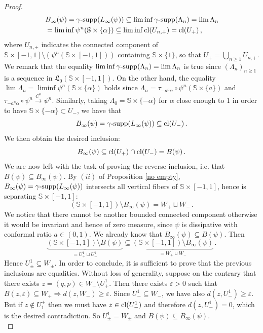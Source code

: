 \documentclass{article}
\newcommand{\1}{\mathbbm{1}}
\theoremstyle{remark}
\begin{document}
\begin{proof}
\begin{eqnarray*}
 & B_{\infty}(\psi) = \gamma\textnormal{-supp}(L_{\infty}(\psi)) \subseteq
 \liminf \gamma\textnormal{-supp}(\Lambda_n) = \lim \Lambda_n \\ & = \liminf \psi^n(\mathbb{S} \times \{\alpha\}) \subseteq \liminf \textnormal{cl}(U_{n,+}) = \textnormal{cl}(U_+)\, ,     
\end{eqnarray*}
where $U_{n,+}$ indicates the connected component of $\mathbb{S} \times [-1,1] \setminus (\psi^n(\mathbb{S} \times [-1,1]))$ containing $\mathbb{S} \times \{1\}$, so that $U_+ = \bigcup_{n \ge 1} U_{n,+}$. \\
We remark that the equality $ \liminf \gamma\textnormal{-supp}(\Lambda_n) = \lim \Lambda_n$ is true since $(\Lambda_n)_{n \ge 1}$ is a sequence in $\mathfrak{L}_0(\mathbb{S} \times [-1,1])$. On the other hand, the equality $\lim \Lambda_n = \liminf \psi^n(\mathbb{S} \times \{\alpha\})$ holds since $\Lambda_n = \tau_{-a^n \alpha} \circ \psi^n(\mathbb{S} \times \{ a \})$ and $\tau_{-a^n \alpha} \circ \psi^n \stackrel{C^0}{\rightarrow} \psi^n$. 
\newline
Similarly, taking $\Lambda_0 = \mathbb{S} \times \{-\alpha\}$ for $\alpha$ close enough to $1$ in order to have
$\mathbb{S} \times \{-\alpha\} \subset U_-$, we have that
$$B_{\infty}(\psi) = \gamma\textnormal{-supp}(L_{\infty}(\psi)) \subseteq \textnormal{cl}(U_-)\, .$$
We then obtain the desired inclusion:
$$B_{\infty}(\psi) \subseteq \textnormal{cl}(U_+) \cap \textnormal{cl}(U_-) = B(\psi)\, .$$
\indent We are now left with the task of proving the reverse inclusion, i.e. that $B(\psi) \subseteq B_{\infty}(\psi)$. By $(ii)$ of Proposition \ref{no empty}, $B_{\infty}(\psi) = \gamma\textnormal{-supp}(L_{\infty}(\psi))$ intersects all vertical fibers of $\mathbb{S} \times [-1,1]$, hence is separating $\mathbb{S} \times [-1,1]$:
$$(\mathbb{S} \times [-1,1]) \setminus B_{\infty}(\psi) = W_+ \sqcup W_-\, .$$
We notice that there cannot be another bounded connected component otherwise it would be invariant and hence of zero measure, since $\psi$ is dissipative with conformal ratio $a \in (0,1)$. We already know that $B_{\infty}(\psi) \subseteq B(\psi)$. Then 
$$\underbrace{(\mathbb{S} \times [-1,1]) \setminus B(\psi)}_{=U^1_+ \sqcup U^1_-} \subseteq \underbrace{(\mathbb{S} \times [-1,1]) \setminus B_{\infty}(\psi)}_{= W_+ \sqcup W_-}\, .$$
Hence $U^1_{\pm} \subseteq W_{\pm}$. In order to conclude, it is sufficient to prove that the previous inclusions are equalities. Without loss of generality, suppose on the contrary that there exists $z = (q,p) \in W_+ \setminus U^1_+$. Then there exists $\varepsilon > 0$ such that $B(z,\varepsilon) \subseteq W_+ \Rightarrow d(z,W_-) \ge \varepsilon$. Since $U_-^1 \subseteq W_-$, we have also $d(z,U^1_{-}) \ge \varepsilon$. But if $z \notin U^+_1$ then we must have $z \in \textnormal{cl}(U_-^1)$ and therefore $d(z,U_-^1) = 0$, which is the desired contradiction. So $U^1_{\pm} = W_{\pm}$ and $B(\psi) \subseteq B_{\infty}(\psi)$. \\

\end{proof}
\end{document}
